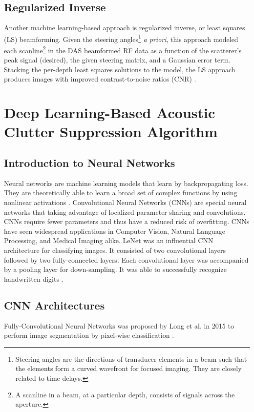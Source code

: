     \subsection{Regularized Inverse}
      Another machine learning-based approach is regularized inverse, or least squares (LS) beamforming. Given the steering angles\footnote{Steering angles are the directions of transducer elements in a beam such that the elements form a curved wavefront for focused imaging. They are closely related to time delays.} \textit{a priori}, this approach modeled each scanline\footnote{A scanline in a beam, at a particular depth, consists of signals across the aperture.} in the DAS beamformed RF data as a function of the scatterer's peak signal (desired), the given steering matrix, and a Gaussian error term. Stacking the per-depth least squares solutions to the model, the LS approach produces images with improved contrast-to-noise ratios (CNR) \cite{szasz_regularized_inverse}. %

  \section{Deep Learning-Based Acoustic Clutter Suppression Algorithm} %
    \subsection{Introduction to Neural Networks}
      Neural networks are machine learning models that learn by backpropagating loss. They are theoretically able to learn a broad set of complex functions by using nonlinear activations \cite{rumelhart1985learning}. Convolutional Neural Networks (CNNs) are special neural networks that taking advantage of localized parameter sharing and convolutions. CNNs require fewer parameters and thus have a reduced risk of overfitting. CNNs have seen widespread applications in Computer Vision, Natural Language Processing, and Medical Imaging alike. LeNet was an influential CNN architecture for classifying images. It consisted of two convolutional layers followed by two fully-connected layers. Each convolutional layer was accompanied by a pooling layer for down-sampling. It was able to successfully recognize handwritten digits \cite{lenet}.

    \subsection{CNN Architectures}
      Fully-Convolutional Neural Networks was proposed by Long et al. in 2015 to perform image segmentation by pixel-wise classification \cite{long2015fcn}.

